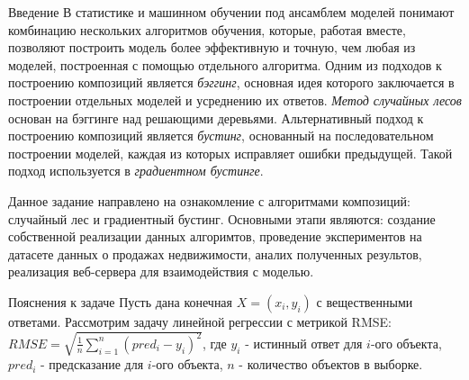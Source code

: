 \documentclass[12pt]{article}
\begin{document}
\newpage
\begin{section}{Введение}
В статистике и машинном обучении под ансамблем моделей понимают комбинацию нескольких алгоритмов обучения, которые, работая вместе, позволяют построить модель более эффективную и точную, чем любая из моделей, построенная с помощью отдельного алгоритма. Одним из подходов к построению композиций является \emph{бэггинг}, основная идея которого заключается в построении отдельных моделей и усреднению их ответов. \emph{Метод случайных лесов} основан на бэггинге над решающими деревьями. Альтернативный подход к построению композиций является \emph{бустинг}, основанный на последовательном построении моделей, каждая из которых исправляет ошибки предыдущей. Такой подход используется в \emph{градиентном бустинге}.

Данное задание направлено на ознакомление с алгоритмами композиций: случайный лес и градиентный бустинг. Основными этапи являются: создание собственной реализации данных алгоримтов, проведение экспериментов на датасете данных о продажах недвижимости, аналих полученных результов, реализация веб-сервера для взаимодействия с моделью.
\end{section}
\begin{section}{Пояснения к задаче}
Пусть дана конечная $X = (x_i, y_i)$ с вещественными ответами.
Рассмотрим задачу линейной регрессии с метрикой RMSE:
$RMSE = \sqrt{\frac{1}{n}\sum_{i=1}^n(pred_i - y_i)^2}$, где $y_i$ - истинный ответ для $i$-ого объекта, $pred_i$ - предсказание для $i$-ого объекта, $n$ - количество объектов в выборке.
\end{section}
\end{document}
